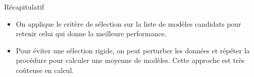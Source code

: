 \documentclass[
  ignorenonframetext,
]{beamer}
\providecommand{\tightlist}{%
  \setlength{\itemsep}{0pt}\setlength{\parskip}{0pt}}\usepackage{longtable,booktabs,array}
\begin{document}
\begin{frame}{Récapitulatif}
\protect\hypertarget{ruxe9capitulatif-4}{}
\begin{itemize}
\tightlist
\item
  On applique le critère de sélection sur la liste de modèles candidats
  pour retenir celui qui donne la meilleure performance.
\item
  Pour éviter une sélection rigide, on peut perturber les données et
  répéter la procédure pour calculer une moyenne de modèles. Cette
  approche est très coûteuse en calcul.
\end{itemize}
\end{frame}
\end{document}
